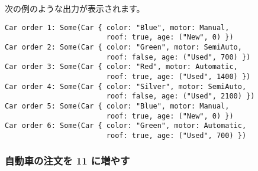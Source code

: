 次の例のような出力が表示されます。


\begin{lstlisting}[numbers=none]
Car order 1: Some(Car { color: "Blue", motor: Manual,
                        roof: true, age: ("New", 0) })
Car order 2: Some(Car { color: "Green", motor: SemiAuto,
                        roof: false, age: ("Used", 700) })
Car order 3: Some(Car { color: "Red", motor: Automatic,
                        roof: true, age: ("Used", 1400) })
Car order 4: Some(Car { color: "Silver", motor: SemiAuto,
                        roof: false, age: ("Used", 2100) })
Car order 5: Some(Car { color: "Blue", motor: Manual,
                        roof: true, age: ("New", 0) })
Car order 6: Some(Car { color: "Green", motor: Automatic,
                        roof: true, age: ("Used", 700) })
\end{lstlisting}

\subsubsection{自動車の注文を 11 に増やす}











